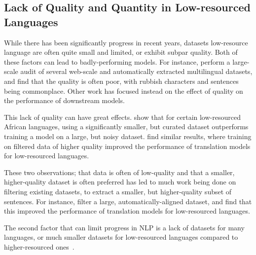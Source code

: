 \documentclass{article}
\newcommand{\mike}[1]{\textcolor{red}{#1}}
\begin{document}
\subsection{Lack of Quality and Quantity in Low-resourced Languages}
While there has been significantly progress in recent years, datasets low-resource language are often quite small and limited, or exhibit subpar quality. Both of these factors can lead to badly-performing models. 
For instance, \citet{kreutzer2021Quality} perform a large-scale audit of several web-scale and automatically extracted multilingual datasets, and find that the quality is often poor, with rubbish characters and sentences being commonplace. Other work has focused instead on the effect of quality on the performance of downstream models.

This lack of quality can have great effects. \citet{alabi2019Massive} show that for certain low-resourced African languages, using a significantly smaller, but curated dataset outperforms training a model on a large, but noisy dataset. \citet{abdulmumin2022Separating} find similar results, where training on filtered data of higher quality improved the performance of translation models for low-resourced languages.

These two observations; that data is often of low-quality and that a smaller, higher-quality dataset is often preferred has led to much work being done on filtering existing datasets, to extract a smaller, but higher-quality subset of sentences. For instance, \citet{abdulmumin2022Separating} filter a large, automatically-aligned dataset, and find that this improved the performance of translation models for low-resourced languages.

The second factor that can limit progress in NLP is a lack of datasets for many languages, or much smaller datasets for low-resourced languages compared to higher-resourced ones~\citep{adelani2022Thousand}.





\end{document}
